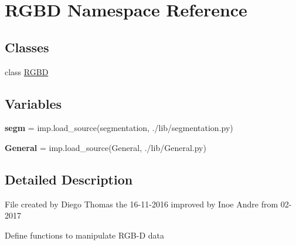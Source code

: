 \hypertarget{namespace_r_g_b_d}{}\section{R\+G\+BD Namespace Reference}
\label{namespace_r_g_b_d}
\subsection*{Classes}
\begin{DoxyCompactItemize}
\item 
class \hyperlink{class_r_g_b_d_1_1_r_g_b_d}{R\+G\+BD}
\end{DoxyCompactItemize}
\subsection*{Variables}
\begin{DoxyCompactItemize}
\item 
\mbox{\label{namespace_r_g_b_d_abe85728633b79c251501dd2da73b1998}} 
{\bfseries segm} = imp.\+load\+\_\+source(\textquotesingle{}segmentation\textquotesingle{}, \textquotesingle{}./lib/segmentation.\+py\textquotesingle{})
\item 
\mbox{\label{namespace_r_g_b_d_a9bdfe6a4ba168d5584046e026d1ed2fa}} 
{\bfseries General} = imp.\+load\+\_\+source(\textquotesingle{}General\textquotesingle{}, \textquotesingle{}./lib/General.\+py\textquotesingle{})
\end{DoxyCompactItemize}


\subsection{Detailed Description}
\begin{DoxyVerb} File created by Diego Thomas the 16-11-2016
 improved by Inoe Andre from 02-2017

 Define functions to manipulate RGB-D data
\end{DoxyVerb}
 